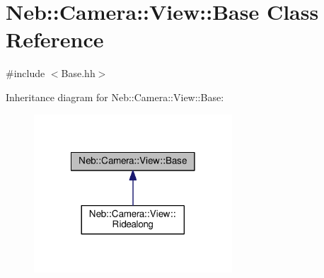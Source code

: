 \hypertarget{classNeb_1_1Camera_1_1View_1_1Base}{\section{Neb\-:\-:Camera\-:\-:View\-:\-:Base Class Reference}
\label{classNeb_1_1Camera_1_1View_1_1Base}
}


 




{\ttfamily \#include $<$Base.\-hh$>$}



Inheritance diagram for Neb\-:\-:Camera\-:\-:View\-:\-:Base\-:
\nopagebreak
\begin{figure}[H]
\begin{center}
\leavevmode
\includegraphics[width=210pt]{classNeb_1_1Camera_1_1View_1_1Base__inherit__graph}
\end{center}
\end{figure}

